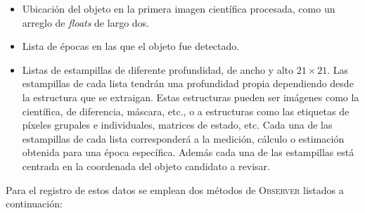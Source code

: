 \begin{itemize}
\item Ubicaci\'on del objeto en la primera imagen cient\'ifica procesada, como un arreglo de \textit{floats} de largo dos. 
\item Lista de \'epocas en las que el objeto fue detectado.
\item Listas de estampillas de diferente profundidad, de ancho y alto $21 \times 21$. Las estampillas de cada lista tendr\'an una profundidad propia dependiendo desde la estructura que se extraigan. Estas estructuras pueden ser im\'agenes como la cient\'ifica, de diferencia, m\'ascara, etc., o a estructuras como las etiquetas de p\'ixeles grupales e individuales, matrices de estado, etc. Cada una de las estampillas de cada lista corresponder\'a a la medici\'on, c\'alculo o estimaci\'on obtenida para una \'epoca espec\'ifica. Adem\'as cada una de las estampillas est\'a centrada en la coordenada del objeto candidato a revisar.   
\end{itemize}
\bigskip

Para el registro de estos datos se emplean dos m\'etodos de \textsc{Observer} listados a continuaci\'on:

